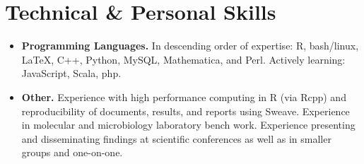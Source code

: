 \documentclass[11pt,letterpaper,sans]{moderncv}        %
\begin{document}
\section{Technical \& Personal Skills}

\vspace{4pt}

\begin{itemize}

\item \textbf{Programming Languages.} In descending order of expertise: R, bash/linux, \LaTeX, C++, Python, MySQL, Mathematica, and Perl. Actively learning: JavaScript, Scala, php.



\vspace{4pt}

\item \textbf{Other.} Experience with high performance computing in R (via Rcpp) and reproducibility of documents, results, and reports using Sweave.  Experience in molecular and microbiology laboratory bench work. Experience presenting and disseminating findings at scientific conferences as well as in smaller groups and one-on-one.

\end{itemize}
\vspace{4pt}
%
%
\end{document}
